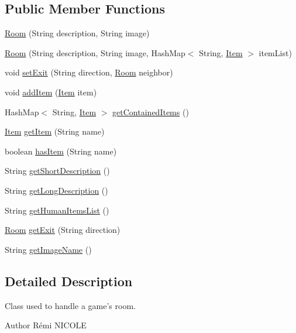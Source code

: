 \subsection*{Public Member Functions}
\begin{DoxyCompactItemize}
\item 
\hyperlink{classRoom_a2cdcbb3d86746330a5a01c7fae4de02c}{Room} (String description, String image)
\item 
\hyperlink{classRoom_a05e162f8831368304aa193ad5a05750c}{Room} (String description, String image, Hash\-Map$<$ String, \hyperlink{classItem}{Item} $>$ item\-List)
\item 
void \hyperlink{classRoom_ae4bc6837f331b5249beb0651fc277018}{set\-Exit} (String direction, \hyperlink{classRoom}{Room} neighbor)
\item 
void \hyperlink{classRoom_a0b4fcc1c1c04e60efa7ae5f82ea37157}{add\-Item} (\hyperlink{classItem}{Item} item)
\item 
Hash\-Map$<$ String, \hyperlink{classItem}{Item} $>$ \hyperlink{classRoom_a4d50f61fe592736e56e9e083b124ff83}{get\-Contained\-Items} ()
\item 
\hyperlink{classItem}{Item} \hyperlink{classRoom_a9b53c8d9f87f4a6d9cc954aeb744d1a2}{get\-Item} (String name)
\item 
boolean \hyperlink{classRoom_ad779b367b26018c9f343ca3044c4b54f}{has\-Item} (String name)
\item 
String \hyperlink{classRoom_a85e561bc5fa9d9c965300e9ad264b02a}{get\-Short\-Description} ()
\item 
String \hyperlink{classRoom_a23a25854d7544fb0b41190a4d6bd1322}{get\-Long\-Description} ()
\item 
String \hyperlink{classRoom_ab8a87ad306f77a936873094b479bcde8}{get\-Human\-Items\-List} ()
\item 
\hyperlink{classRoom}{Room} \hyperlink{classRoom_a384ab8c844e5775f87de24d6c470637e}{get\-Exit} (String direction)
\item 
String \hyperlink{classRoom_a8177668df4d8be718812934673c42649}{get\-Image\-Name} ()
\end{DoxyCompactItemize}


\subsection{Detailed Description}
Class used to handle a game's room. \begin{DoxyAuthor}{Author}
Rémi N\-I\-C\-O\-L\-E 
\end{DoxyAuthor}


